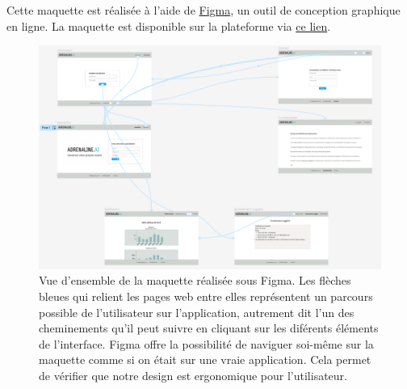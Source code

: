 \documentclass[french]{article}
\begin{document}
    Cette maquette est réalisée à l'aide de \href{https://www.figma.com/}{Figma}, un outil de conception graphique en ligne. La maquette est disponible sur la plateforme via \href{https://www.figma.com/design/bnhI3kF6nxTpzE3eWSHdCg/Adrenaline.AI?m=dev&node-id=3-15&t=JgaLgxLw4a6ylK5V-1}{ce lien}.
    \begin{figure}[h!]
        \includegraphics[width=12cm]{figma}
        \centering
        \caption{Vue d'ensemble de la maquette réalisée sous Figma. Les flèches bleues qui relient les pages web entre elles représentent un parcours possible de l'utilisateur sur l'application, autrement dit l'un des cheminements qu'il peut suivre en cliquant sur les diférents éléments de l'interface. Figma offre la possibilité de naviguer soi-même sur la maquette comme si on était sur une vraie application. Cela permet de vérifier que notre design est ergonomique pour l'utilisateur.}
        \centering
    \end{figure}
\end{document}

